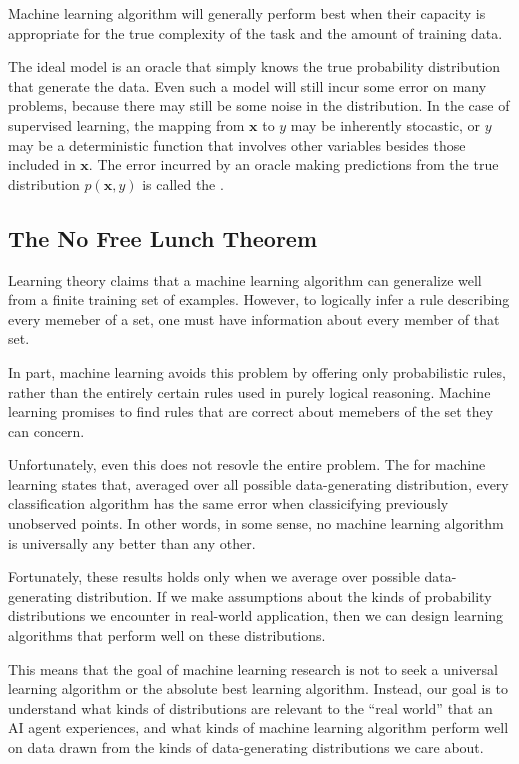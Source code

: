 \begin{tcolorbox}
  Machine learning algorithm will generally perform best when their capacity is appropriate for the true complexity of the task and the amount of training data.
\end{tcolorbox}



The ideal model is an oracle that simply knows the true probability distribution that generate the data.
Even such a model will still incur some error on many problems, because there may still be some noise in the distribution.
In the case of supervised learning, the mapping from $\bm{x}$ to $y$ may be inherently stocastic, or $y$ may be a deterministic function that involves other variables besides those included in $\bm{x}$.
The error incurred by an oracle making predictions from the true distribution $p(\bm{x},y)$ is called the .


\subsection{The No Free Lunch Theorem}

Learning theory claims that a machine learning algorithm can generalize well from a finite training set of examples.
However, to logically infer a rule describing every memeber of a set, one must have information about every member of that set.

In part, machine learning avoids this problem by offering only probabilistic rules, rather than the entirely certain rules used in purely logical reasoning.
Machine learning promises to find rules that are  correct about  memebers of the set they can concern.


Unfortunately, even this does not resovle the entire problem.
The  for machine learning states that, averaged over all possible data-generating distribution, every classification algorithm has the same error when classicifying previously unobserved points.
In other words, in some sense, no machine learning algorithm is universally any better than any other.

Fortunately, these results holds only when we average over  possible data-generating distribution.
If we make assumptions about the kinds of probability distributions we encounter in real-world application, then we can design learning algorithms that perform well on these distributions.


This means that the goal of machine learning research is not to seek a universal learning algorithm or the absolute best learning algorithm.
Instead, our goal is to understand what kinds of distributions are relevant to the ``real world'' that an AI agent experiences, and what kinds of machine learning algorithm perform well on data drawn from the kinds of data-generating distributions we care about.


